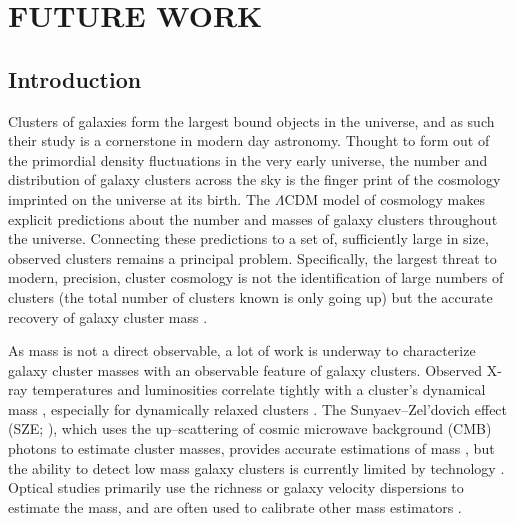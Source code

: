 %
%
%



\chapter[\uppercase{Future Work}]{\uppercase{Future Work}}

\section{Introduction} Clusters of galaxies form the largest bound objects in the universe, and as such their study is a cornerstone in modern day astronomy. Thought to form out of the primordial density fluctuations in the very early universe, the number and distribution of galaxy clusters across the sky is the finger print of the cosmology imprinted on the universe at its birth. The $\Lambda$CDM model of cosmology makes explicit predictions about the number and masses of galaxy clusters throughout the universe. Connecting these predictions to a set of, sufficiently large in size, observed clusters remains a principal problem. Specifically, the largest threat to modern, precision, cluster cosmology is not the identification of large numbers of clusters (the total number of clusters known is only going up) but the accurate recovery of galaxy cluster mass . 

As mass is not a direct observable, a lot of work is underway to characterize galaxy cluster masses with an observable feature of galaxy clusters. Observed X-ray temperatures and luminosities correlate tightly with a cluster's dynamical mass , especially for dynamically relaxed clusters . The Sunyaev--Zel'dovich effect (SZE; \citealt{Sunyaev1972}), which uses the up--scattering of cosmic microwave background (CMB) photons to estimate cluster masses, provides accurate estimations of mass , but the ability to detect low mass galaxy clusters is currently limited by technology . Optical studies  primarily use the richness  or galaxy velocity dispersions to estimate the mass, and are often used to calibrate other mass estimators . 

